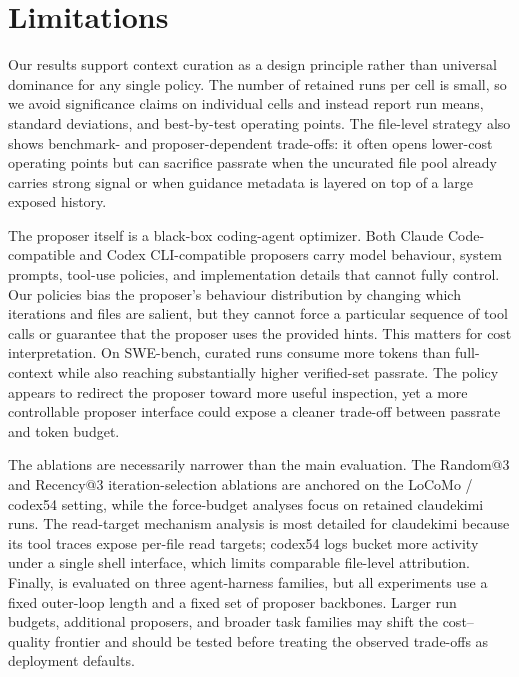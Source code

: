 \section{Limitations}
\label{sec:limits}

Our results support context curation as a design principle rather than
universal dominance for any single policy. The number of retained runs per
cell is small, so we avoid significance claims on individual cells and
instead report run means, standard deviations, and best-by-test operating
points. The file-level strategy also shows benchmark- and proposer-dependent
trade-offs: it often opens lower-cost operating points but can sacrifice
passrate when the uncurated file pool already carries strong signal or when
guidance metadata is layered on top of a large exposed history.

The proposer itself is a black-box coding-agent optimizer. Both Claude
Code-compatible and Codex CLI-compatible proposers carry model behaviour,
system prompts, tool-use policies, and implementation details that \name
cannot fully control. Our policies bias the proposer's behaviour
distribution by changing which iterations and files are salient, but they
cannot force a particular sequence of tool calls or guarantee that the
proposer uses the provided hints. This matters for cost interpretation. On
SWE-bench, curated runs consume more tokens than full-context while also
reaching substantially higher verified-set passrate. The policy appears to
redirect the proposer toward more useful inspection, yet a more controllable
proposer interface could expose a cleaner trade-off between passrate and
token budget.

The ablations are necessarily narrower than the main evaluation. The
Random@$3$ and Recency@$3$ iteration-selection ablations are anchored on the
LoCoMo / codex54 setting, while the force-budget analyses focus on retained
claudekimi runs. The read-target mechanism analysis is most detailed for
claudekimi because its tool traces expose per-file read targets; codex54
logs bucket more activity under a single shell interface, which limits
comparable file-level attribution. Finally, \name is evaluated on three
agent-harness families, but all experiments use a fixed outer-loop length and
a fixed set of proposer backbones. Larger run budgets, additional proposers,
and broader task families may shift the cost--quality frontier and should be
tested before treating the observed trade-offs as deployment defaults.
